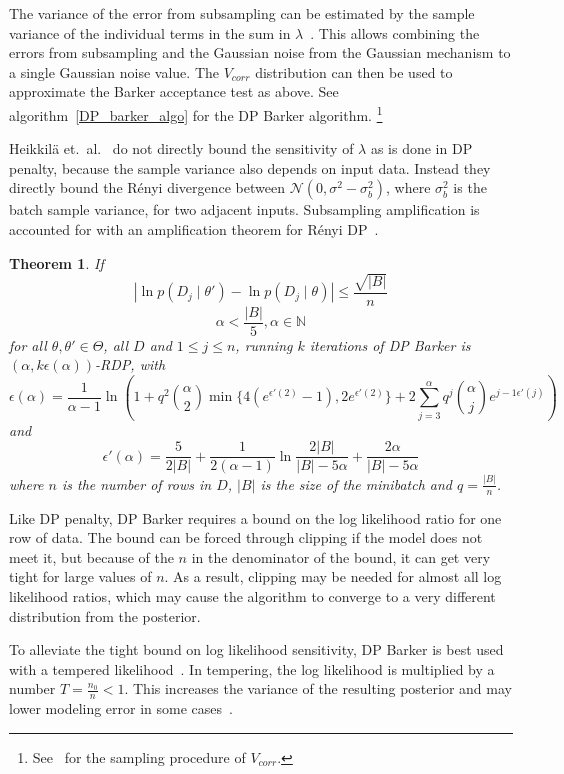 \documentclass[english,twoside,openright]{HYgraduMLDS}
\newtheorem{theorem}{Theorem}
\newcommand{\N}{\mathbb{N}}
\newcommand{\caln}{{\mathcal{N}}}
\begin{document}
The variance of the error from subsampling can 
be estimated by the sample variance of the individual terms in the sum in 
\(\lambda\)~\cite{HeikkilaJDH19}. This allows combining the errors from subsampling and the 
Gaussian noise from the Gaussian mechanism to a single Gaussian noise value.
The \(V_{corr}\) distribution can then be used to approximate the Barker acceptance 
test as above. See algorithm~\ref{DP_barker_algo} for the DP Barker algorithm.
\footnote{
    See~\cite{HeikkilaJDH19} for the sampling procedure of \(V_{corr}\).
}

Heikkilä et.\ al.~\cite{HeikkilaJDH19} do not directly bound the sensitivity 
of \(\lambda\) as is done in DP penalty, because the sample variance also 
depends on input data. Instead they directly bound the Rényi divergence 
between \(\caln(0, \sigma^2 - \sigma^2_b)\), where \(\sigma^2_b\) is the 
batch sample variance, for two adjacent inputs. Subsampling amplification 
is accounted for with an amplification theorem for Rényi DP~\cite{WangBK19}.

\begin{theorem}
    If 
    \[
        |\ln p(D_j\mid \theta') - \ln p(D_j\mid \theta)| \leq \frac{\sqrt{|B|}}{n}
    \]
    \[
        \alpha < \frac{|B|}{5}, \alpha \in \N
    \]
    for all \(\theta, \theta' \in \Theta\), all \(D\) and \(1\leq j \leq n\),
    running \(k\) iterations of DP Barker is \((\alpha, k\epsilon(\alpha))\)-RDP, 
    with 
    \[
        \epsilon(\alpha) = \frac{1}{\alpha - 1}\ln \left(
        1 + q^2\binom{\alpha}{2}\min\{4(e^{\epsilon'(2)} - 1), 2e^{\epsilon'(2)}\}
        + 2 \sum_{j=3}^\alpha q^j\binom{\alpha}{j}e^{j-1\epsilon'(j)}\right)
    \]
    and 
    \[
        \epsilon'(\alpha) = \frac{5}{2|B|} + \frac{1}{2(\alpha - 1)}
        \ln \frac{2|B|}{|B| - 5\alpha} + \frac{2\alpha}{|B| - 5\alpha}
    \]
    where \(n\) is the number of rows in \(D\), \(|B|\) is the size of the 
    minibatch and \(q = \frac{|B|}{n}\).
\end{theorem}

Like DP penalty, DP Barker requires a bound on the log likelihood ratio for 
one row of data. The bound can be forced through clipping if the model does not 
meet it, but because of the \(n\) in the denominator of the bound, it can get 
very tight for large values of \(n\). As a result, clipping may be needed for 
almost all log likelihood ratios, which may cause the algorithm to converge 
to a very different distribution from the posterior.

To alleviate the tight bound on log likelihood sensitivity, DP Barker is best 
used with a tempered likelihood~\cite{HeikkilaJDH19}. In tempering, the 
log likelihood is multiplied by a number \(T = \frac{n_0}{n} < 1\). This 
increases the variance of the resulting posterior and may lower modeling 
error in some cases~\cite{HeikkilaJDH19}.
\end{document}

